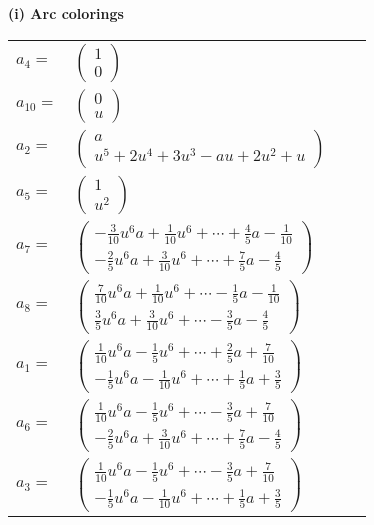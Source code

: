 \documentclass[1p]{elsarticle_modified}
\theoremstyle{definition}
\begin{document}
\flushleft \textbf{(i) Arc colorings}\\
\begin{tabular}{m{7pt} m{180pt} m{7pt} m{180pt} }
\flushright $a_{4}=$&$\begin{pmatrix}1\\0\end{pmatrix}$ \\
\flushright $a_{10}=$&$\begin{pmatrix}0\\u\end{pmatrix}$ \\
\flushright $a_{2}=$&$\begin{pmatrix}a\\u^5+2 u^4+3 u^3- a u+2 u^2+u\end{pmatrix}$ \\
\flushright $a_{5}=$&$\begin{pmatrix}1\\u^2\end{pmatrix}$ \\
\flushright $a_{7}=$&$\begin{pmatrix}-\frac{3}{10} u^6 a+\frac{1}{10} u^6+\cdots+\frac{4}{5} a-\frac{1}{10}\\-\frac{2}{5} u^6 a+\frac{3}{10} u^6+\cdots+\frac{7}{5} a-\frac{4}{5}\end{pmatrix}$ \\
\flushright $a_{8}=$&$\begin{pmatrix}\frac{7}{10} u^6 a+\frac{1}{10} u^6+\cdots-\frac{1}{5} a-\frac{1}{10}\\\frac{3}{5} u^6 a+\frac{3}{10} u^6+\cdots-\frac{3}{5} a-\frac{4}{5}\end{pmatrix}$ \\
\flushright $a_{1}=$&$\begin{pmatrix}\frac{1}{10} u^6 a-\frac{1}{5} u^6+\cdots+\frac{2}{5} a+\frac{7}{10}\\-\frac{1}{5} u^6 a-\frac{1}{10} u^6+\cdots+\frac{1}{5} a+\frac{3}{5}\end{pmatrix}$ \\
\flushright $a_{6}=$&$\begin{pmatrix}\frac{1}{10} u^6 a-\frac{1}{5} u^6+\cdots-\frac{3}{5} a+\frac{7}{10}\\-\frac{2}{5} u^6 a+\frac{3}{10} u^6+\cdots+\frac{7}{5} a-\frac{4}{5}\end{pmatrix}$ \\
\flushright $a_{3}=$&$\begin{pmatrix}\frac{1}{10} u^6 a-\frac{1}{5} u^6+\cdots-\frac{3}{5} a+\frac{7}{10}\\-\frac{1}{5} u^6 a-\frac{1}{10} u^6+\cdots+\frac{1}{5} a+\frac{3}{5}\end{pmatrix}$ \\

\end{tabular}
\end{document}
